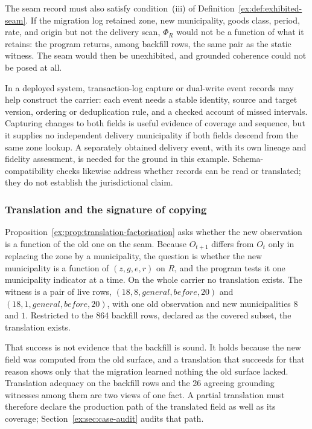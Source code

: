 \documentclass[twocolumn,envcountsect,envcountsame,natbib]{svjour3}
\begin{document}
The seam record must also satisfy condition~(iii) of Definition~\ref{ex:def:exhibited-seam}. If the migration log retained zone, new municipality, goods class, period, rate, and origin but not the delivery scan, $\Phi_R$ would not be a function of what it retains: the program returns, among backfill rows, the same pair as the static witness. The seam would then be unexhibited, and grounded coherence could not be posed at all.

In a deployed system, transaction-log capture or dual-write event records may help construct the carrier: each event needs a stable identity, source and target version, ordering or deduplication rule, and a checked account of missed intervals. Capturing changes to both fields is useful evidence of coverage and sequence, but it supplies no independent delivery municipality if both fields descend from the same zone lookup. A separately obtained delivery event, with its own lineage and fidelity assessment, is needed for the ground in this example. Schema-compatibility checks likewise address whether records can be read or translated; they do not establish the jurisdictional claim.

\subsubsection{Translation and the signature of copying}

Proposition~\ref{ex:prop:translation-factorisation} asks whether the new observation is a function of the old one on the seam. Because $O_{t+1}$ differs from $O_t$ only in replacing the zone by a municipality, the question is whether the new municipality is a function of $(z,g,e,r)$ on $R$, and the program tests it one municipality indicator at a time. On the whole carrier no translation exists. The witness is a pair of live rows, $(18,8,\mathit{general},\mathit{before},20)$ and $(18,1,\mathit{general},\mathit{before},20)$, with one old observation and new municipalities $8$ and $1$. Restricted to the 864 backfill rows, declared as the covered subset, the translation exists.

That success is not evidence that the backfill is sound. It holds because the new field was computed from the old surface, and a translation that succeeds for that reason shows only that the migration learned nothing the old surface lacked. Translation adequacy on the backfill rows and the 26 agreeing grounding witnesses among them are two views of one fact. A partial translation must therefore declare the production path of the translated field as well as its coverage; Section~\ref{ex:sec:case-audit} audits that path.
\end{document}
